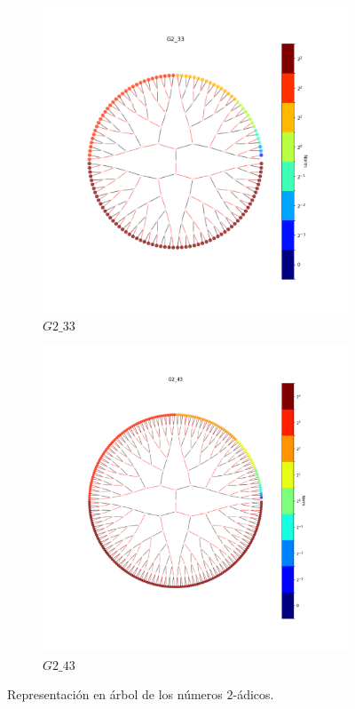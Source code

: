 \begin{figure}
\begin{subfigure}{.5\textwidth}
		\includegraphics[width=.8\linewidth]{img/G2_33}
		\caption{$\mathit{G2\_33}$}
		\label{fig:sfig1}
	\end{subfigure}%
	\begin{subfigure}{.5\textwidth}
		\centering
		\includegraphics[width=.8\linewidth]{img/G2_43}
		\caption{$\mathit{G2\_43}$}
		\label{fig:sfig1}
	\end{subfigure}%
	\caption{Representación en árbol de los números $2$-ádicos.}
	\label{2adics_trees}
\end{figure}